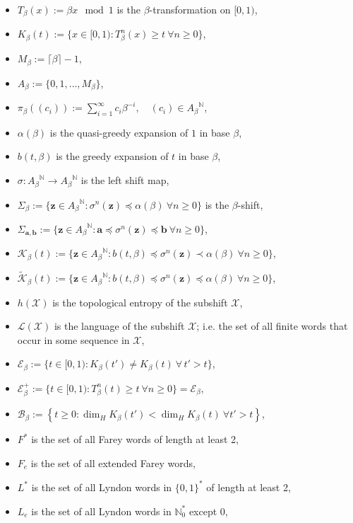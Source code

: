 \documentclass[11pt]{amsart}
\theoremstyle{definition}
\theoremstyle{remark}
\numberwithin{equation}{section}
\newcommand{\N}{\ensuremath{\mathbb{N}}}
\newcommand{\BB}{\mathscr{B}}
\newcommand{\EE}{\mathscr{E}}
\newcommand{\F}{F^*}
\newcommand{\Kt}{\widetilde{\mathcal{K}}}
\renewcommand{\a}{ {\mathbf{a}}}
\renewcommand{\b}{ {\mathbf{b}}}
\newcommand{\cL}{\mathcal{L}}
\newcommand{\XX}{\mathcal{X}}
\newcommand{\z}{\mathbf{z}}
\newcommand{\set}[1]{\left\{#1\right\}}
\newcommand{\f}{\infty}
\newcommand{\al}{\alpha}
\newcommand{\lle}{\preccurlyeq}
\renewcommand{\a}{ \mathbf{a}}
\newcommand{\si}{\sigma}
\begin{document}
\begin{itemize}
\item $T_\beta(x):=\beta x\!\!\mod 1$ is the $\beta$-transformation on $[0,1)$,
\item $K_\beta(t):=\{x\in[0,1): T_\beta^n(x)\geq t\ \forall n\geq 0\}$,
\item {$M_\beta:=\lceil\beta\rceil-1$},
\item {$A_\beta:=\{0,1,\dots,M_\beta\}$},
\item $\pi_\beta((c_i)):=\sum_{i=1}^\f c_i\beta^{-i}, \quad (c_i)\in{A_\beta}^\N$,
\item $\al(\beta)$ is the quasi-greedy expansion of $1$ in base $\beta$,
\item $b(t,\beta)$ is the greedy expansion of $t$ in base $\beta$,
\item $\si:{A_\beta}^\N\to{A_\beta}^\N$ is the left shift map,
\item $\Sigma_\beta:=\{\z\in{A_\beta}^\N: \sigma^n(\z)\lle \alpha(\beta)\ \forall n\geq 0\}$ is the $\beta$-shift,
\item $\Sigma_{\a,\b}:=\{\z\in{A_\beta}^\N: \a\lle\si^n(\z)\lle \b\ \forall n\geq 0\}$,
\item $\mathcal{K}_\beta(t):=\{\z\in{A_\beta}^\N: b(t,\beta)\lle \sigma^n(\z)\prec \alpha(\beta)\ \forall n\geq 0\}$,
\item $\Kt_\beta(t):=\{\z\in{A_\beta}^\N: b(t,\beta)\lle \sigma^n(\z)\lle \alpha(\beta)\ \forall n\geq 0\}$,
\item $h(\mathcal{X})$ is the topological entropy of the subshift $\mathcal{X}$,
\item $\cL(\mathcal{X})$ is the language of the subshift $\XX$; i.e. the set of all finite words that occur in some sequence in $\XX$,
\item $\EE_\beta:=\{t\in[0,1): K_\beta(t')\neq K_\beta(t)\ \forall\,t'>t\}$,
\item $\EE_\beta^+:=\{t\in[0,1): T_\beta^n(t)\geq t\ \forall n\geq 0\}=\EE_\beta$,
\item $\BB_\beta:=\set{t\ge 0: \dim_H K_\beta(t')<\dim_H K_\beta(t)~\forall t'>t}$,
\item $\F$ is the set of all Farey words of length at least 2,
\item {$F_e$ is the set of all extended Farey words},
\item $L^*$ is the set of all Lyndon words {in $\{0,1\}^*$} of length at least 2,
\item {$L_e$ is the set of all Lyndon words in $\N_0^*$ except $0$,}

\end{itemize}
\end{document}
